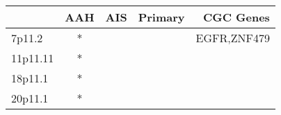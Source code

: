 \begin{tabular}{lcccr}
\toprule
{} & AAH & AIS & Primary &    CGC Genes \\
\midrule
7p11.2   &   * &     &         &  EGFR,ZNF479 \\
11p11.11 &   * &     &         &              \\
18p11.1  &   * &     &         &              \\
20p11.1  &   * &     &         &              \\
\bottomrule
\end{tabular}
